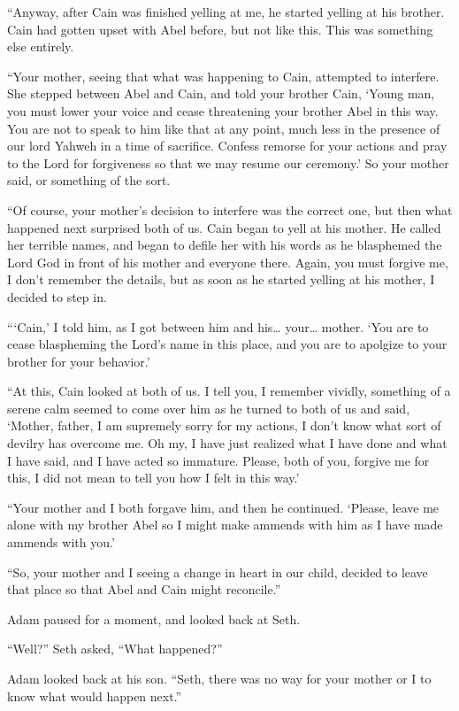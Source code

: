 \documentclass[12pt,twoside,titlepage]{report}
\begin{document}
``Anyway, after Cain was finished yelling at me, he started yelling at
his brother. Cain had gotten upset with Abel before, but not like this.
This was something else entirely.

``Your mother, seeing that what was happening to Cain, attempted to
interfere. She stepped between Abel and Cain, and told your brother
Cain, `Young man, you must lower your voice and cease threatening your
brother Abel in this way. You are not to speak to him like that at any
point, much less in the presence of our lord Yahweh in a time of
sacrifice. Confess remorse for your actions and pray to the Lord for
forgiveness so that we may resume our ceremony.' So your mother said, or
something of the sort.

``Of course, your mother's decision to interfere was the correct one,
but then what happened next surprised both of us. Cain began to yell at
his mother. He called her terrible names, and began to defile her with
his words as he blasphemed the Lord God in front of his mother and
everyone there. Again, you must forgive me, I don't remember the
details, but as soon as he started yelling at his mother, I decided to
step in.

```Cain,' I told him, as I got between him and his\ldots{} your\ldots{}
mother. `You are to cease blaspheming the Lord's name in this place, and
you are to apolgize to your brother for your behavior.'

``At this, Cain looked at both of us. I tell you, I remember vividly,
something of a serene calm seemed to come over him as he turned to both
of us and said, `Mother, father, I am supremely sorry for my actions, I
don't know what sort of devilry has overcome me. Oh my, I have just
realized what I have done and what I have said, and I have acted so
immature. Please, both of you, forgive me for this, I did not mean to
tell you how I felt in this way.'

``Your mother and I both forgave him, and then he continued. `Please,
leave me alone with my brother Abel so I might make ammends with him as
I have made ammends with you.'

``So, your mother and I seeing a change in heart in our child, decided
to leave that place so that Abel and Cain might reconcile.''

Adam paused for a moment, and looked back at Seth.

``Well?'' Seth asked, ``What happened?''

Adam looked back at his son. ``Seth, there was no way for your mother or
I to know what would happen next.''
\end{document}
